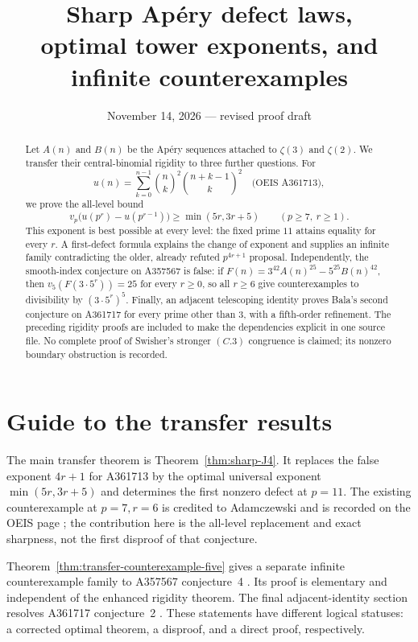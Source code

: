 \documentclass[11pt]{amsart}
\title[Sharp Ap\'ery defect laws]{Sharp Ap\'ery defect laws,\\ optimal tower exponents, and infinite counterexamples}
\date{November 14, 2026 --- revised proof draft}
\theoremstyle{definition}
\theoremstyle{remark}
\begin{document}
\begin{abstract}
Let $A(n)$ and $B(n)$ be the Ap\'ery sequences attached to $\zeta(3)$ and
$\zeta(2)$. We transfer their central-binomial rigidity to three further
questions. For
\[
u(n)=\sum_{k=0}^{n-1}\binom nk^2\binom{n+k-1}k^2
\quad\text{(OEIS A361713)},
\]
we prove the all-level bound
\[
v_p\bigl(u(p^r)-u(p^{r-1})\bigr)\ge\min(5r,3r+5)
\qquad(p\ge7,\ r\ge1).
\]
This exponent is best possible at every level: the fixed prime $11$
attains equality for every $r$. A first-defect formula explains the
change of exponent and supplies an infinite family contradicting the
older, already refuted $p^{4r+1}$ proposal.
Independently, the smooth-index conjecture on A357567 is false:
if $F(n)=3^{42}A(n)^{25}-5^{25}B(n)^{42}$, then
$v_5(F(3\cdot5^r))=25$ for every $r\ge0$, so all $r\ge6$ give
counterexamples to divisibility by $(3\cdot5^r)^5$.
Finally, an adjacent telescoping identity proves Bala's second conjecture
on A361717 for every prime other than $3$, with a fifth-order refinement.
The preceding rigidity proofs are included to make the dependencies
explicit in one source file. No complete proof of Swisher's stronger
$(C.3)$ congruence is claimed; its nonzero boundary obstruction is recorded.
\end{abstract}

\maketitle

\section*{Guide to the transfer results}
The main transfer theorem is Theorem~\ref{thm:sharp-J4}. It replaces the
false exponent $4r+1$ for A361713 by the optimal universal exponent
$\min(5r,3r+5)$ and determines the first nonzero defect at $p=11$.
The existing counterexample at $p=7,r=6$ is credited to Adamczewski
and is recorded on the OEIS page \cite{A361713,Adam}; the contribution
here is the all-level replacement and exact sharpness, not the first
disproof of that conjecture.

Theorem~\ref{thm:transfer-counterexample-five} gives a separate infinite
counterexample family to A357567 conjecture~4 \cite{A357567}. Its proof
is elementary and independent of the enhanced rigidity theorem.
The final adjacent-identity section resolves A361717 conjecture~2
\cite{A361717}. These statements have different logical statuses:
a corrected optimal theorem, a disproof, and a direct proof, respectively.
\end{document}
